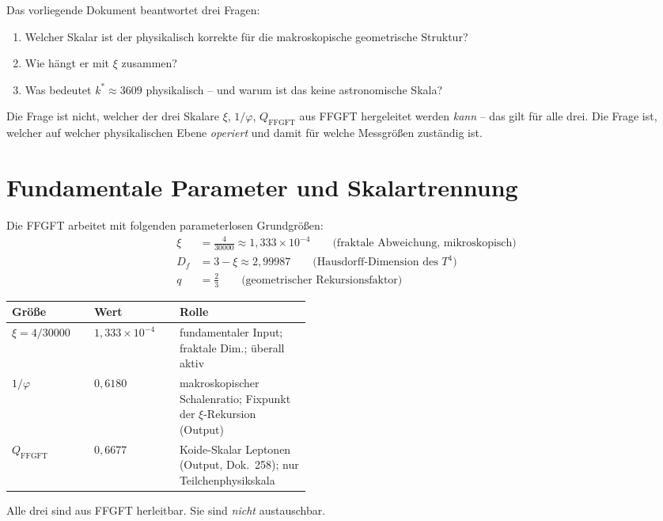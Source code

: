 Das vorliegende Dokument beantwortet drei Fragen:
\begin{enumerate}
  \item Welcher Skalar ist der physikalisch korrekte für die makroskopische
        geometrische Struktur?
  \item Wie hängt er mit $\xi$ zusammen?
  \item Was bedeutet $k^* \approx 3609$ physikalisch -- und warum ist das
        keine astronomische Skala?
\end{enumerate}

\begin{remark}
Die Frage ist nicht, welcher der drei Skalare $\xi$, $1/\varphi$,
$Q_\mathrm{FFGFT}$ aus FFGFT hergeleitet werden \emph{kann} -- das gilt
für alle drei. Die Frage ist, welcher auf welcher physikalischen Ebene
\emph{operiert} und damit für welche Messgrößen zuständig ist.
\end{remark}

\section{Fundamentale Parameter und Skalartrennung}

Die FFGFT arbeitet mit folgenden parameterlosen Grundgrößen:
\begin{align}
  \xi   &= \frac{4}{30000} \approx 1{,}333 \times 10^{-4}
    \qquad \text{(fraktale Abweichung, mikroskopisch)} \label{eq:xi275}\\
  D_f   &= 3 - \xi \approx 2{,}99987
    \qquad \text{(Hausdorff-Dimension des }T^4\text{)} \label{eq:Df275}\\
  q     &= \frac{2}{3}
    \qquad \text{(geometrischer Rekursionsfaktor)} \label{eq:q275}
\end{align}

\begin{definition}\label{def:skalare275}
\begin{center}
\begin{tabular}{@{}llp{0.44\linewidth}@{}}
\toprule
Größe & Wert & Rolle \\
\midrule
$\xi = 4/30000$ & $1{,}333\times10^{-4}$ &
  fundamentaler Input; fraktale Dim.; überall aktiv \\
$1/\varphi$ & $0{,}6180$ &
  makroskopischer Schalenratio; Fixpunkt der $\xi$-Rekursion (Output) \\
$Q_\mathrm{FFGFT}$ & $0{,}6677$ &
  Koide-Skalar Leptonen (Output, Dok.~258); nur Teilchenphysikskala \\
\bottomrule
\end{tabular}
\end{center}
Alle drei sind aus FFGFT herleitbar. Sie sind \emph{nicht} austauschbar.
\end{definition}

